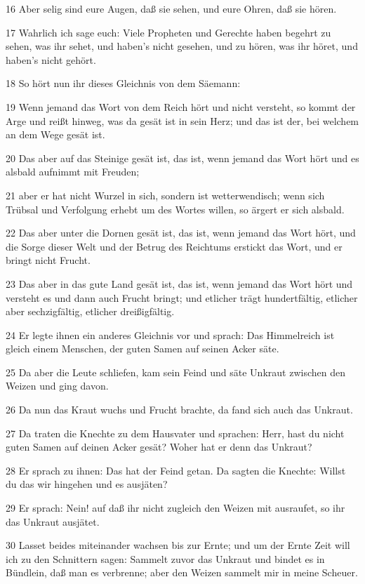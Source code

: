 \par 16 Aber selig sind eure Augen, daß sie sehen, und eure Ohren, daß sie hören.
\par 17 Wahrlich ich sage euch: Viele Propheten und Gerechte haben begehrt zu sehen, was ihr sehet, und haben's nicht gesehen, und zu hören, was ihr höret, und haben's nicht gehört.
\par 18 So hört nun ihr dieses Gleichnis von dem Säemann:
\par 19 Wenn jemand das Wort von dem Reich hört und nicht versteht, so kommt der Arge und reißt hinweg, was da gesät ist in sein Herz; und das ist der, bei welchem an dem Wege gesät ist.
\par 20 Das aber auf das Steinige gesät ist, das ist, wenn jemand das Wort hört und es alsbald aufnimmt mit Freuden;
\par 21 aber er hat nicht Wurzel in sich, sondern ist wetterwendisch; wenn sich Trübsal und Verfolgung erhebt um des Wortes willen, so ärgert er sich alsbald.
\par 22 Das aber unter die Dornen gesät ist, das ist, wenn jemand das Wort hört, und die Sorge dieser Welt und der Betrug des Reichtums erstickt das Wort, und er bringt nicht Frucht.
\par 23 Das aber in das gute Land gesät ist, das ist, wenn jemand das Wort hört und versteht es und dann auch Frucht bringt; und etlicher trägt hundertfältig, etlicher aber sechzigfältig, etlicher dreißigfältig.
\par 24 Er legte ihnen ein anderes Gleichnis vor und sprach: Das Himmelreich ist gleich einem Menschen, der guten Samen auf seinen Acker säte.
\par 25 Da aber die Leute schliefen, kam sein Feind und säte Unkraut zwischen den Weizen und ging davon.
\par 26 Da nun das Kraut wuchs und Frucht brachte, da fand sich auch das Unkraut.
\par 27 Da traten die Knechte zu dem Hausvater und sprachen: Herr, hast du nicht guten Samen auf deinen Acker gesät? Woher hat er denn das Unkraut?
\par 28 Er sprach zu ihnen: Das hat der Feind getan. Da sagten die Knechte: Willst du das wir hingehen und es ausjäten?
\par 29 Er sprach: Nein! auf daß ihr nicht zugleich den Weizen mit ausraufet, so ihr das Unkraut ausjätet.
\par 30 Lasset beides miteinander wachsen bis zur Ernte; und um der Ernte Zeit will ich zu den Schnittern sagen: Sammelt zuvor das Unkraut und bindet es in Bündlein, daß man es verbrenne; aber den Weizen sammelt mir in meine Scheuer.
